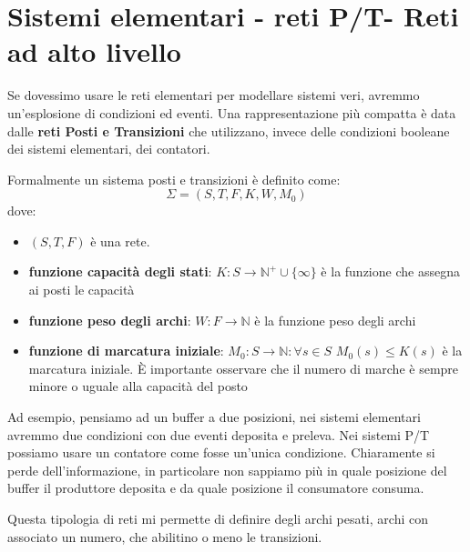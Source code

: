 \section{Sistemi elementari - reti P/T- Reti ad alto livello}
Se dovessimo usare le reti elementari per modellare sistemi veri, avremmo
un'esplosione di condizioni ed eventi. Una rappresentazione più compatta è data
dalle \textbf{reti Posti e Transizioni} che utilizzano, invece delle condizioni
booleane dei sistemi elementari, dei contatori.
\begin{definizione}
    Formalmente un sistema posti e transizioni è definito come:
    \begin{equation}
        \Sigma = (S, T, F, K, W, M_0)
    \end{equation}
    dove:
    \begin{itemize}
        \item $(S, T, F)$ è una rete.
        \item \textbf{funzione capacità degli stati}: $K: S \to \mathbb{N}^+ \cup \{\infty\}$ è la funzione che assegna ai
              posti le capacità
        \item \textbf{funzione peso degli archi}: $W: F \to \mathbb{N}$ è la funzione peso degli archi
        \item \textbf{funzione di marcatura iniziale}: $M_0: S \to \mathbb{N}: \forall s \in S$ $M_0(s) \leq K(s)$ è la
              marcatura iniziale. È importante osservare che il numero di marche è sempre
              minore o uguale alla capacità del posto
    \end{itemize}
\end{definizione}
Ad esempio, pensiamo ad un buffer a due posizioni, nei sistemi elementari avremmo
due condizioni con due eventi deposita e preleva. Nei sistemi P/T possiamo usare
un contatore come fosse un'unica condizione. Chiaramente si perde dell'informazione,
in particolare non sappiamo più in quale posizione del buffer il produttore
deposita e da quale posizione il consumatore consuma.

Questa tipologia di reti mi permette di definire degli archi pesati, archi con
associato un numero, che abilitino o meno le transizioni.

